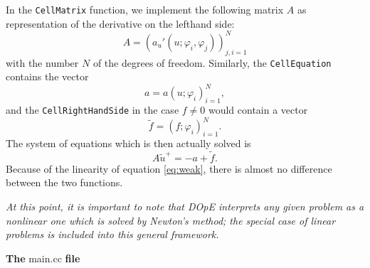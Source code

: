 In the \texttt{CellMatrix} function, we implement the following matrix $A$ as representation of the derivative on the lefthand side:
\begin{equation*}
  A = (a_u'(u;\varphi_i,\varphi_j))_{j,i=1}^N
\end{equation*}
with the number $N$ of the degrees of freedom. Similarly, the \texttt{CellEquation} contains the vector
\begin{equation*}
  a = a(u;\varphi_i)_{i=1}^{N},
\end{equation*}
and the \texttt{CellRightHandSide} in the case $f \neq 0$ would contain a vector
\begin{equation*}
  \tilde{f} = (f;\varphi_i)_{i=1}^N.
\end{equation*}
The system of equations which is then actually solved is
\begin{equation*}
  A\tilde{u}^+ = -a + \tilde{f}.
\end{equation*}
Because of the linearity of equation \eqref{eq:weak}, there is almost no difference between the two functions.\\

\vspace{0.1cm}

\textit{At this point, it is important to note that DOpE interprets any given problem as a nonlinear one which is solved by Newton's method; the special case of linear problems is included into this general framework.}\\

\vspace{0.2cm}

\textbf{The} main.cc \textbf{file}\\

\vspace{0.2cm}

